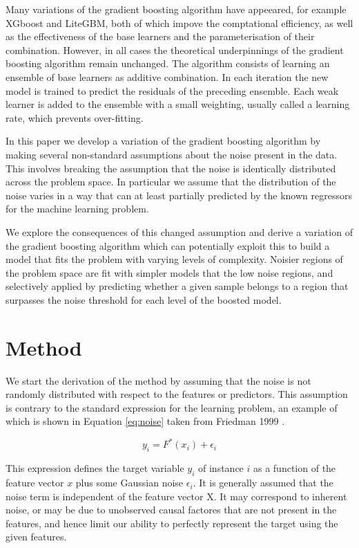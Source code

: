 \documentclass[11pt,twoside,a4paper]{article}
\begin{document}
Many variations of the gradient boosting algorithm have appeeared, for example
XGboost and LiteGBM, both of which impove the comptational efficiency, as well as the effectiveness
of the base learners and the parameterisation of their combination.
However, in all cases the theoretical underpinnings of the gradient boosting algorithm
remain unchanged. The algorithm consists of learning an ensemble of base learners
as additive combination. In each iteration the new model is trained to predict the
residuals of the preceding ensemble. Each weak learner is added to the ensemble with
a small weighting, usually called a learning rate, which prevents over-fitting.

In this paper we develop a variation of the gradient boosting algorithm by making
several non-standard assumptions about the noise present in the data. 
This involves breaking the assumption that the noise is identically distributed across the 
problem space. In particular we assume that the distribution of the noise varies in a way that
can at least partially predicted by the known regressors for the machine learning problem.

We explore the consequences of this changed assumption and derive a variation of the gradient
boosting algorithm which can potentially exploit this to build a model that fits the problem
with varying levels of complexity. Noisier regions of the problem space are fit with simpler
models that the low noise regions, and selectively applied by predicting whether a given sample
belongs to a region that surpasses the noise threshold for each level of the boosted model. 


\section{Method}

We start the derivation of the method by  assuming that the noise is not randomly distributed with respect to the 
features or predictors. This assumption is contrary to the standard expression for the learning problem, 
an example of which is shown in Equation \ref{eq:noise} taken from Friedman 1999 \cite{Friedman1999}.

\begin{equation}
y_i = F^*(x_i) + \epsilon_i
\label{eq:noise}
\end{equation}

This expression defines the target variable $y_i$ of instance $i$ as a function of the feature vector $x$
plus some Gaussian noise $\epsilon_i$. It is generally assumed that the noise term is independent of the
feature vector X. It may correspond to inherent noise, or may be due to unobserved causal factores that are
not present in the features, and hence limit our ability to perfectly represent the target using the given
features.
\end{document}
